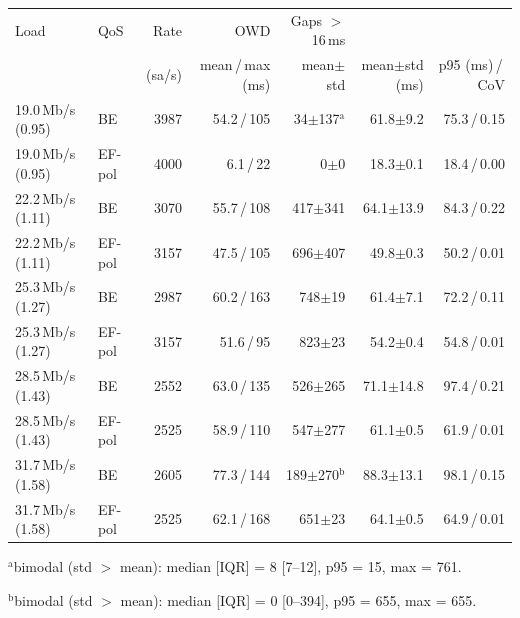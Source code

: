 \begin{tabular}{llrrrrr}
\toprule
Load & QoS & Rate & OWD & Gaps $>$16\,ms & \ttrip{} & \ttrip{} \\
 & & (sa/s) & mean\,/\,max (ms) & mean$\pm$std & mean$\pm$std (ms) & p95 (ms)\,/\,CoV \\
\midrule
19.0\,Mb/s (0.95) & BE & 3987 & 54.2\,/\,105 & 34$\pm$137$^{\mathrm{a}}$ & 61.8$\pm$9.2 & 75.3\,/\,0.15 \\
19.0\,Mb/s (0.95) & EF-pol & 4000 & 6.1\,/\,22 & 0$\pm$0 & 18.3$\pm$0.1 & 18.4\,/\,0.00 \\
22.2\,Mb/s (1.11) & BE & 3070 & 55.7\,/\,108 & 417$\pm$341 & 64.1$\pm$13.9 & 84.3\,/\,0.22 \\
22.2\,Mb/s (1.11) & EF-pol & 3157 & 47.5\,/\,105 & 696$\pm$407 & 49.8$\pm$0.3 & 50.2\,/\,0.01 \\
25.3\,Mb/s (1.27) & BE & 2987 & 60.2\,/\,163 & 748$\pm$19 & 61.4$\pm$7.1 & 72.2\,/\,0.11 \\
25.3\,Mb/s (1.27) & EF-pol & 3157 & 51.6\,/\,95 & 823$\pm$23 & 54.2$\pm$0.4 & 54.8\,/\,0.01 \\
28.5\,Mb/s (1.43) & BE & 2552 & 63.0\,/\,135 & 526$\pm$265 & 71.1$\pm$14.8 & 97.4\,/\,0.21 \\
28.5\,Mb/s (1.43) & EF-pol & 2525 & 58.9\,/\,110 & 547$\pm$277 & 61.1$\pm$0.5 & 61.9\,/\,0.01 \\
31.7\,Mb/s (1.58) & BE & 2605 & 77.3\,/\,144 & 189$\pm$270$^{\mathrm{b}}$ & 88.3$\pm$13.1 & 98.1\,/\,0.15 \\
31.7\,Mb/s (1.58) & EF-pol & 2525 & 62.1\,/\,168 & 651$\pm$23 & 64.1$\pm$0.5 & 64.9\,/\,0.01 \\
\bottomrule
\end{tabular}
\par\smallskip\footnotesize $^{\mathrm{a}}$bimodal (std $>$ mean): median [IQR] = 8 [7--12], p95 = 15, max = 761.
\par\smallskip\footnotesize $^{\mathrm{b}}$bimodal (std $>$ mean): median [IQR] = 0 [0--394], p95 = 655, max = 655.
